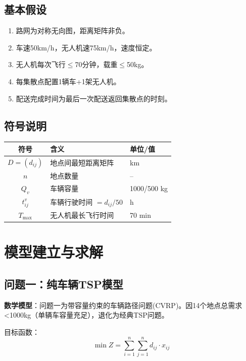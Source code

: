 \documentclass[12pt,a4paper]{ctexart}
\begin{document}
\subsection{基本假设}
\begin{enumerate}
    \item 路网为对称无向图，距离矩阵非负。
    \item 车速50km/h，无人机速75km/h，速度恒定。
    \item 无人机每次飞行$\le$70分钟，载重$\le$50kg。
    \item 每集散点配置1辆车+1架无人机。
    \item 配送完成时间为最后一次配送返回集散点的时刻。
\end{enumerate}

\subsection{符号说明}
\begin{table}[H]
\centering
\begin{tabular}{c|l|l}
\toprule
符号 & 含义 & 单位/值 \\
\midrule
$D=(d_{ij})$ & 地点间最短距离矩阵 & km \\
$n$ & 地点数量 & -- \\
$Q_v$ & 车辆容量 & 1000/500 kg \\
$t_{ij}^v$ & 车辆行驶时间 $=d_{ij}/50$ & h \\
$T_{\max}$ & 无人机最长飞行时间 & 70 min \\
\bottomrule
\end{tabular}
\end{table}

\section{模型建立与求解}

\subsection{问题一：纯车辆TSP模型}

\textbf{数学模型}：问题一为带容量约束的车辆路径问题(CVRP)。因14个地点总需求<1000kg（单辆车容量充足），退化为经典TSP问题。

目标函数：
\begin{equation}
\min Z = \sum_{i=1}^{n}\sum_{j=1}^{n} d_{ij} \cdot x_{ij}
\end{equation}
\end{document}
